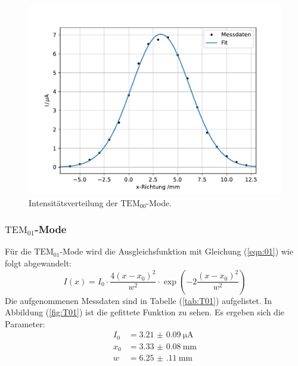 \begin{figure}[h!]
  \centering
  \includegraphics[scale=0.7]{fig/plot2.pdf}
  \caption{Intensitätsverteilung der $\mathrm{TEM}_\mathrm{00}$-Mode.}
  \label{fig:T00}
\end{figure}
\FloatBarrier
\subsubsection{$\mathrm{TEM}_\mathrm{01}$-Mode}

Für die $\text{TEM}_{01}$-Mode wird die Ausgleichsfunktion mit Gleichung (\ref{eqn:01}) wie folgt abgewandelt:
\begin{equation}
  I(x) = I_\mathrm{0} \cdot \dfrac{4(x-x_\mathrm{0})^2}{w^2} \cdot \exp\left(-2\frac{(x-x_\mathrm{0})^2}{w^2}\right)
\end{equation}
Die aufgenommenen Messdaten sind in Tabelle (\ref{tab:T01}) aufgelistet.
In Abbildung (\ref{fig:T01}) ist die gefittete Funktion zu sehen.
Es ergeben sich die Parameter:
\begin{align*}
I_\mathrm{0} &= \SI{3.21(9)}{\micro\ampere}\\
x_\mathrm{0} &= \SI{3.33(8)}{\milli\meter}\\
w &= \SI{6.25(11)}{\milli\meter}
\end{align*}

